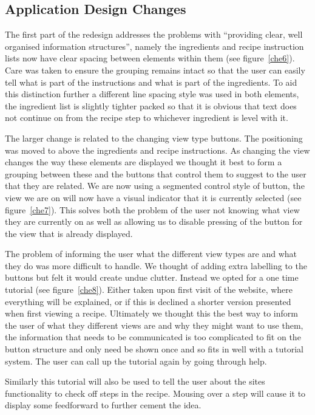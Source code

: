 \subsection{Application Design Changes}
The first part of the redesign addresses the problems with “providing clear, well organised information structures”, namely the ingredients and recipe instruction lists now have clear spacing between elements within them (see figure~\ref{che6}). Care was taken to ensure the grouping remains intact so that the user can easily tell what is part of the instructions and what is part of the ingredients. To aid this distinction further a different line spacing style was used in both elements, the ingredient list is slightly tighter packed so that it is obvious that text does not continue on from the recipe step to whichever ingredient is level with it.

The larger change is related to the changing view type buttons. The positioning was moved to above the ingredients and recipe instructions. As changing the view changes the way these elements are displayed we thought it best to form a grouping between these and the buttons that control them to suggest to the user that they are related. We are now using a segmented control style of button, the view we are on will now have a visual indicator that it is currently selected (see figure~\ref{che7}). This solves both the problem of the user not knowing what view they are currently on as well as allowing us to disable pressing of the button for the view that is already displayed.

The problem of informing the user what the different view types are and what they do was more difficult to handle. We thought of adding extra labelling to the buttons but felt it would create undue clutter. Instead we opted for a one time tutorial (see figure~\ref{che8}). Either taken upon first visit of the website, where everything will be explained, or if this is declined a shorter version presented when first viewing a recipe. Ultimately we thought this the best way to inform the user of what they different views are and why they might want to use them, the information that needs to be communicated is too complicated to fit on the button structure and only need be shown once and so fits in well with a tutorial system. The user can call up the tutorial again by going through help. 

Similarly this tutorial will also be used to tell the user about the sites functionality to check off steps in the recipe. Mousing over a step will cause it to display some feedforward to further cement the idea.
